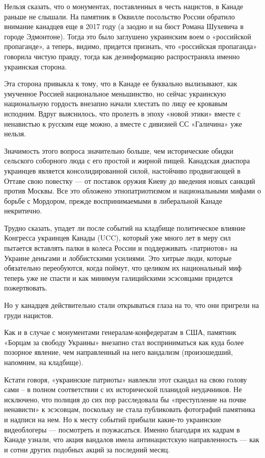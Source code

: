 Нельзя сказать, что о монументах, поставленных в честь нацистов, в Канаде
раньше не слышали. На памятник в Оквилле посольство России обратило внимание
канадцев еще в 2017 году (а заодно и на бюст Романа Шухевича в городе
Эдмонтоне). Тогда это было заглушено украинским воем о «российской пропаганде»,
а теперь, видимо, придется признать, что «российская пропаганда» говорила
чистую правду, тогда как дезинформацию распространяла именно украинская
сторона.

Эта сторона привыкла к тому, что в Канаде ее буквально вылизывают, как
умученное Россией национальное меньшинство, но сейчас украинскую национальную
гордость внезапно начали хлестать по лицу ее кровавым исподним. Вдруг
выяснилось, что пролезть в эпоху «новой этики» вместе с ненавистью к русским
еще можно, а вместе с дивизией СС «Галичина» уже нельзя.

Значимость этого вопроса значительно больше, чем исторические обидки сельского
соборного люда с его простой и жирной пищей. Канадская диаспора украинцев
является консолидированной силой, настойчиво продвигающей в Оттаве свою
повестку --- от поставок оружия Киеву до введения новых санкций против Москвы.
Все это обложено этнопатриотизмом и национальными мифами о борьбе с Мордором,
прежде воспринимаемыми в либеральной Канаде некритично. 

Трудно сказать, упадет ли после событий на кладбище политическое влияние
Конгресса украинцев Канады (UCC), который уже много лет в меру сил пытается
вставлять палки в колеса России и поддерживать «патриотов» на Украине деньгами
и лоббистскими усилиями. Это хитрые люди, которые обязательно переобуются,
когда поймут, что целиком их национальный миф теперь уже не спасти и как
минимум галицийскими эсэсовцами придется пожертвовать.

Но у канадцев действительно стали открываться глаза на то, что они пригрели на
груди нацистов.

Как и в случае с монументами генералам-конфедератам в США, памятник «Борцам за
свободу Украины» внезапно стал восприниматься как куда более позорное явление,
чем направленный на него вандализм (произошедший, напомним, на кладбище).

Кстати говоря, «украинские патриоты» навлекли этот скандал на свою голову сами
– в полном соответствии с их исторической планидой неудачников. Не исключено,
что полиция до сих пор расследовала бы «преступление на почве ненависти» к
эсэсовцам, поскольку не стала публиковать фотографий памятника и надписи на
нем. Но к месту событий прибыли какие-то украинские видеоблогеры --- посмотреть и
поужасаться. Именно благодаря их кадрам в Канаде узнали, что акция вандалов
имела антинацистскую направленность --- как и сотни других подобных акций за
последний месяц.

